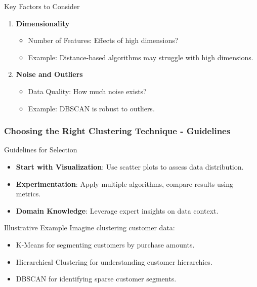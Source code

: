 \documentclass[aspectratio=169]{beamer}
\begin{document}
\begin{frame}[fragile]
\begin{block}{Key Factors to Consider}
\begin{enumerate}
            \item \textbf{Dimensionality}
                \begin{itemize}
                    \item Number of Features: Effects of high dimensions?
                    \item Example: Distance-based algorithms may struggle with high dimensions.
                \end{itemize}

            \item \textbf{Noise and Outliers}
                \begin{itemize}
                    \item Data Quality: How much noise exists?
                    \item Example: DBSCAN is robust to outliers.
                \end{itemize}
        \end{enumerate}
    \end{block}
\end{frame}

\begin{frame}[fragile]
    \frametitle{Choosing the Right Clustering Technique - Guidelines}
    \begin{block}{Guidelines for Selection}
        \begin{itemize}
            \item \textbf{Start with Visualization}: Use scatter plots to assess data distribution.
            \item \textbf{Experimentation}: Apply multiple algorithms, compare results using metrics.
            \item \textbf{Domain Knowledge}: Leverage expert insights on data context.
        \end{itemize}
    \end{block}
    
    \begin{block}{Illustrative Example}
        Imagine clustering customer data:
        \begin{itemize}
            \item K-Means for segmenting customers by purchase amounts.
            \item Hierarchical Clustering for understanding customer hierarchies.
            \item DBSCAN for identifying sparse customer segments.
        \end{itemize}
    \end{block}
\end{frame}
\end{document}
